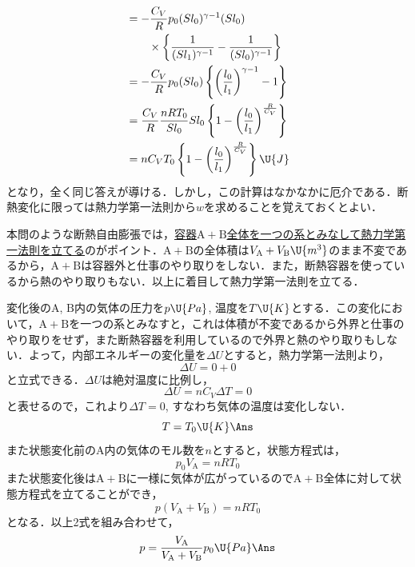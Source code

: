 \begin{multicols}{2}
\begin{komon}
\begin{bekkai}
\[\begin{aligned}
          &=-\frac{C_V}{R}p_0(Sl_0)^{\gamma-1}(Sl_0)\\
          &\qquad\times\left\{\frac{1}{(Sl_1)^{\gamma-1}}-\frac{1}{(Sl_0)^{\gamma-1}}\right\}\\
          &=-\frac{C_V}{R}p_0(Sl_0)\left\{\left(\frac{l_0}{l_1}\right)^{\gamma-1}-1\right\}\\
          &=\frac{C_V}{R}\frac{nRT_0}{Sl_0}Sl_0\left\{1-\left(\frac{l_0}{l_1}\right)^{\frac{R}{C_V}}\right\}\\
          &=nC_VT_0\left\{1-\left(\frac{l_0}{l_1}\right)^{\frac{R}{C_V}}\right\}\U{J}
       \end{aligned}\]
       となり，全く同じ答えが導ける．しかし，この計算はなかなかに厄介である．断熱変化に限っては熱力学第一法則から$w$を求めることを覚えておくとよい．
       \end{bekkai}
\end{komon}

\par\nopagebreak
\begin{sisin}
本問のような断熱自由膨張では，\underline{容器$\mathrm{A+B}$}\hskip0pt\underline{全体を一}\hskip0pt\underline{つの系と}\hskip0pt\underline{みなして}\hskip0pt\underline{熱力学第}\hskip0pt\underline{一法則を}\hskip0pt\underline{立てる}のがポイント．$\mathrm{A+B}$の全体積は$V_\mathrm{A}+V_\mathrm{B}\U{m^3}$のまま不変であるから，$\mathrm{A+B}$は容器外と仕事のやり取りをしない．また，断熱容器を使っているから熱のやり取りもない．以上に着目して熱力学第一法則を立てる．
\end{sisin}
\KaiHead
変化後の$\mathrm{A}$, $\mathrm{B}$内の気体の圧力を$p\U{Pa}$, 温度を$T\U{K}$とする．この変化において，$\mathrm{A+B}$を一つの系とみなすと，これは体積が不変であるから外界と仕事のやり取りをせず，また断熱容器を利用しているので外界と熱のやり取りもしない．よって，内部エネルギーの変化量を$\Delta U$とすると，熱力学第一法則より，
\[\Delta U=0+0\]
と立式できる．$\Delta U$は絶対温度に比例し，
\[\Delta U=nC_V\Delta T=0\]
と表せるので，これより$\Delta T=0$, すなわち気体の温度は変化しない．
\[T=T_0\U{K}\Ans\]
また状態変化前の$\mathrm{A}$内の気体のモル数を$n$とすると，状態方程式は，
\[p_0V_\mathrm{A}=nRT_0\]
また状態変化後は$\mathrm{A+B}$に一様に気体が広がっているので$\mathrm{A+B}$全体に対して状態方程式を立てることができ，
\[p(V_\mathrm{A}+V_\mathrm{B})=nRT_0\]
となる．以上2式を組み合わせて，
\[p=\frac{V_\mathrm{A}}{V_\mathrm{A}+V_\mathrm{B}}p_0\U{Pa}\Ans\]


\end{multicols}
